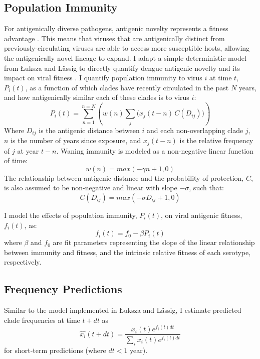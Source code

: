 \subsection*{Population Immunity}
For antigenically diverse pathogens, antigenic novelty represents a fitness advantage \citep{lipsitch2007patterns}.
This means that viruses that are antigenically distinct from previously-circulating viruses are able to access more susceptible hosts, allowing the antigenically novel lineage to expand.
I adapt a simple deterministic model from {\L}uksza and L\"assig to directly quantify dengue antigenic novelty and its impact on viral fitness \citep{luksza2014predictive}.
I quantify population immunity to virus $i$ at time $t$, $P_i(t)$, as a function of which clades have recently circulated in the past $N$ years, and how antigenically similar each of these clades is to virus $i$:
\begin{equation}
  \label{eq_population_immunity}
P_i(t) = \sum_{n=1}^{n=N} \left(w(n)  \sum_{j} \Big( x_j(t-n) \, C( D_{ij}) \Big) \right)
\end{equation}
Where $D_{ij}$ is the antigenic distance between $i$ and each non-overlapping clade $j$, $n$ is the number of years since exposure, and $x_j(t-n)$ is the relative frequency of $j$ at year $t-n$.
Waning immunity is modeled as a non-negative linear function of time:
\begin{equation}
\label{eq_waning_immunity}
  w(n) = max(-\gamma n + 1, 0)
\end{equation}
The relationship between antigenic distance and the probability of protection, $C$, is also assumed to be non-negative and linear with slope $-\sigma$, such that:
\begin{equation}
C(D_{ij}) = max(-\sigma D_{ij} + 1, 0)
\end{equation}

I model the effects of population immunity, $P_i(t)$, on viral antigenic fitness, $f_i(t)$, as:
\begin{equation}
  \label{eq_fitness}
f_i(t) = f_0-\beta P_i(t)
\end{equation}
where $\beta$ and $f_0$ are fit parameters representing the slope of the linear relationship between immunity and fitness, and the intrinsic relative fitness of each serotype, respectively.

\subsection*{Frequency Predictions}
Similar to the model implemented in {\L}uksza and L\"assig, I estimate predicted clade frequencies at time $t + dt$ as
\begin{equation}
  \label{eq_predict_frequency}
\hat{x_i}(t+dt) = \frac{x_i(t) e^{f_i(t) dt}}{\sum_{i}x_i(t) e^{f_i(t) dt}}
\end{equation}
for short-term predictions (where $dt < 1$ year).


